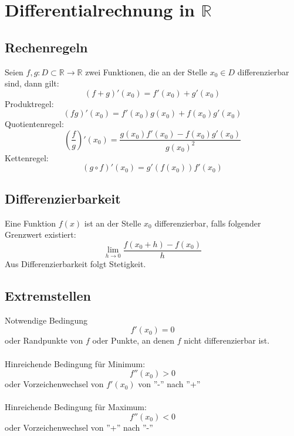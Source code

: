 \documentclass[a4paper,twocolumn,10pt]{article}
\begin{document}
\section{Differentialrechnung in $\mathbb{R}$}

\subsection{Rechenregeln}
Seien $f,g:D\subset \mathbb{R}\rightarrow\mathbb{R}$ zwei Funktionen, die an der Stelle $x_0\in D$ differenzierbar sind, dann gilt:
\begin{equation*}
(f+g)'(x_0)=f'(x_0)+g'(x_0)
\end{equation*}
Produktregel:
\begin{equation*}
(fg)'(x_0)=f'(x_0)g(x_0)+f(x_0)g'(x_0)
\end{equation*}
Quotientenregel:
\begin{equation*}
\left(\frac{f}{g}\right)'(x_0)=\frac{g(x_0)f'(x_0)-f(x_0)g'(x_0)}{g(x_0)^2}
\end{equation*}
Kettenregel:
\begin{equation*}
(g\circ f)'(x_0)=g'(f(x_0))f'(x_0)
\end{equation*}

\subsection{Differenzierbarkeit}
Eine Funktion $f(x)$ ist an der Stelle $x_0$ differenzierbar, falls folgender Grenzwert existiert:
\begin{equation*}
\lim\limits_{h\rightarrow 0}\frac{f(x_0+h)-f(x_0)}{h}
\end{equation*}
Aus Differenzierbarkeit folgt Stetigkeit.

\subsection{Extremstellen}
Notwendige Bedingung
\begin{equation*}
f'(x_0)=0
\end{equation*}
oder Randpunkte von $f$ oder Punkte, an denen $f$ nicht differenzierbar ist.\\\\
Hinreichende Bedingung für Minimum:
\begin{equation*}
f''(x_0)>0
\end{equation*}
oder Vorzeichenwechsel von $f'(x_0)$ von ''-'' nach ''+''\\\\
Hinreichende Bedingung für Maximum:
\begin{equation*}
f''(x_0)<0
\end{equation*}
oder Vorzeichenwechsel von ''+'' nach ''-''
\end{document}
